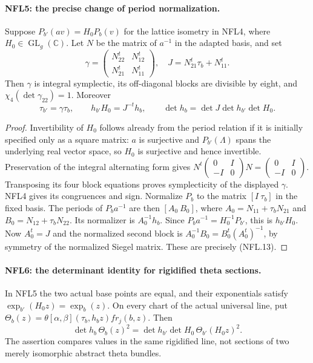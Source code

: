 \documentclass[11pt,a4paper]{article}
\numberwithin{equation}{section}
\theoremstyle{remark}\newtheorem{remark}[theorem]{Remark}
\begin{document}
\paragraph{NFL5: the precise change of period normalization.}
\label{claim:NFL5}
Suppose $P_{b'}(a v)=H_0P_b(v)$ for the lattice isometry in NFL4,
where $H_0\in\operatorname{GL}_g(\mathbb C)$.  Let $N$ be the
matrix of $a^{-1}$ in the adapted basis, and set
\[
 \gamma=\begin{pmatrix}N_{22}^t&N_{12}^t\\N_{21}^t&N_{11}^t\end{pmatrix},
 \quad J=N_{21}^t\tau_b+N_{11}^t.
\]
Then $\gamma$ is integral symplectic, its off-diagonal blocks are
divisible by eight, and $\chi_4(\det\gamma_{22})=1$.  Moreover
\[
 \tau_{b'}=\gamma\tau_b,\qquad
 h_{b'}H_0=J^{-t}h_b,\qquad
 \det h_b=\det J\det h_{b'}\det H_0.
 \tag{NFL.13}
\]

\begin{proof}
Invertibility of $H_0$ follows already from the period relation
if it is initially specified only as a square matrix: $a$ is
surjective and $P_{b'}(\Lambda)$ spans the underlying real
vector space, so $H_0$ is surjective and hence invertible.
Preservation of the integral alternating form gives
$N^t\left(\begin{smallmatrix}0&I\\-I&0\end{smallmatrix}\right)N
=\left(\begin{smallmatrix}0&I\\-I&0\end{smallmatrix}\right)$.
Transposing its four block equations proves symplecticity of
the displayed $\gamma$.  NFL4 gives its congruences and sign.
Normalize $P_b$ to the matrix $[I\ \tau_b]$ in the fixed basis.
The periods of $P_ba^{-1}$ are then
$[A_0\ B_0]$, where
$A_0=N_{11}+\tau_bN_{21}$ and
$B_0=N_{12}+\tau_bN_{22}$.
Its normalizer is $A_0^{-1}h_b$.  Since
$P_ba^{-1}=H_0^{-1}P_{b'}$, this is $h_{b'}H_0$.
Now $A_0^t=J$ and the normalized second block is
$A_0^{-1}B_0=B_0^t(A_0^t)^{-1}$, by symmetry of the normalized
Siegel matrix.  These are precisely (NFL.13).
\end{proof}

\paragraph{NFL6: the determinant identity for rigidified theta sections.}
\label{claim:NFL6}
In NFL5 the two actual base points are equal, and their
exponentials satisfy $\exp_{b'}(H_0z)=\exp_b(z)$.
On every chart of the actual universal line, put
$\Theta_b(z)=\theta[\alpha,\beta](\tau_b,h_bz)fr_j(b,z)$.
Then
\[
 \det h_b\,\Theta_b(z)^2
   =\det h_{b'}\det H_0\,\Theta_{b'}(H_0z)^2.
 \tag{NFL.14}
\]
The assertion compares values in the same rigidified line, not
sections of two merely isomorphic abstract theta bundles.
\end{document}
